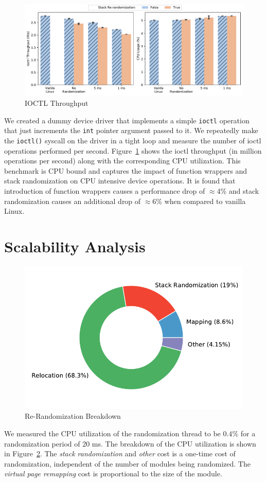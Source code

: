 \begin{figure}[ht!]
\centering
\includegraphics[width=\columnwidth]{charts/ioctrl.pdf}
\caption{IOCTL Throughput}
\label{fig:ioctl}
\end{figure}

We created a dummy device driver that implements a simple \verb|ioctl| operation that just increments the \verb|int| pointer argument passed to it. We repeatedly make the \verb|ioctl()| syscall on the driver in a tight loop and measure the number of ioctl operations performed per second. Figure~\ref{fig:ioctl} shows the ioctl throughput (in million operations per second) along with the corresponding CPU utilization. This benchmark is CPU bound and captures the impact of function wrappers and stack randomization on CPU intensive device operations. It is found that introduction of function wrappers causes a performance drop of $\approx$4\% and stack randomization causes an additional drop of $\approx$6\% when compared to vanilla Linux.

\section{Scalability Analysis}
\begin{figure}
\caption{Re-Randomization Breakdown}
\label{fig:rand_profile}
\includegraphics[width=0.5\columnwidth]{charts/rand_profile.pdf}
\end{figure}

We measured the CPU utilization of the randomization thread to be $0.4\%$ for a randomization period of 20 ms. The breakdown of the CPU utilization is shown in Figure~\ref{fig:rand_profile}. The \textit{stack randomization} and \textit{other} cost is a one-time cost of randomization, independent of the number of modules being randomized. The \textit{virtual page remapping} cost is proportional to the size of the module.


